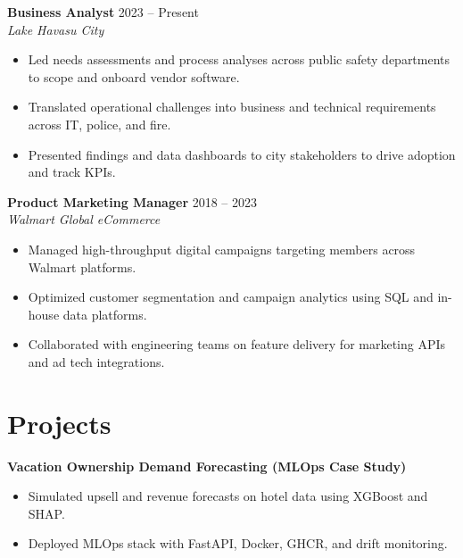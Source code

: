 \documentclass[a4paper,10pt]{article}
\begin{document}
\textbf{Business Analyst} \hfill 2023 -- Present \\
\textit{Lake Havasu City} \\
\begin{itemize}[leftmargin=*, itemsep=2pt, parsep=0pt]
    \item Led needs assessments and process analyses across public safety departments to scope and onboard vendor software.
    \item Translated operational challenges into business and technical requirements across IT, police, and fire.
    \item Presented findings and data dashboards to city stakeholders to drive adoption and track KPIs.
\end{itemize}

\textbf{Product Marketing Manager} \hfill 2018 -- 2023 \\
\textit{Walmart Global eCommerce} \\
\begin{itemize}[leftmargin=*, itemsep=2pt, parsep=0pt]
    \item Managed high-throughput digital campaigns targeting members across Walmart platforms.
    \item Optimized customer segmentation and campaign analytics using SQL and in-house data platforms.
    \item Collaborated with engineering teams on feature delivery for marketing APIs and ad tech integrations.
\end{itemize}

\section*{Projects}

\textbf{Vacation Ownership Demand Forecasting (MLOps Case Study)} \\
\begin{itemize}[leftmargin=*, itemsep=2pt, parsep=0pt]
    \item Simulated upsell and revenue forecasts on hotel data using XGBoost and SHAP.
    \item Deployed MLOps stack with FastAPI, Docker, GHCR, and drift monitoring.
\end{itemize}
\end{document}
